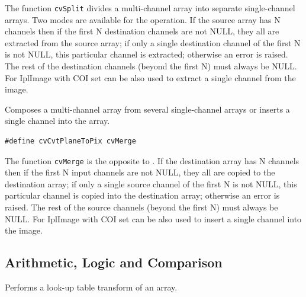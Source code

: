 The function \texttt{cvSplit} divides a multi-channel array into separate
single-channel arrays. Two modes are available for the operation. If the
source array has N channels then if the first N destination channels
are not NULL, they all are extracted from the source array;
if only a single destination channel of the first N is not NULL, this
particular channel is extracted; otherwise an error is raised. The rest
of the destination channels (beyond the first N) must always be NULL. For
IplImage  with COI set can be also used to extract a single
channel from the image.


\label{Merge}

Composes a multi-channel array from several single-channel arrays or inserts a single channel into the array.


\begin{lstlisting}
#define cvCvtPlaneToPix cvMerge
\end{lstlisting}

\begin{description}
\end{description}

The function \texttt{cvMerge} is the opposite to . If the destination array has N channels then if the first N input channels are not NULL, they all are copied to the destination array; if only a single source channel of the first N is not NULL, this particular channel is copied into the destination array; otherwise an error is raised. The rest of the source channels (beyond the first N) must always be NULL. For IplImage  with COI set can be also used to insert a single channel into the image.


\subsection{Arithmetic, Logic and Comparison}

\label{LUT}

Performs a look-up table transform of an array.


